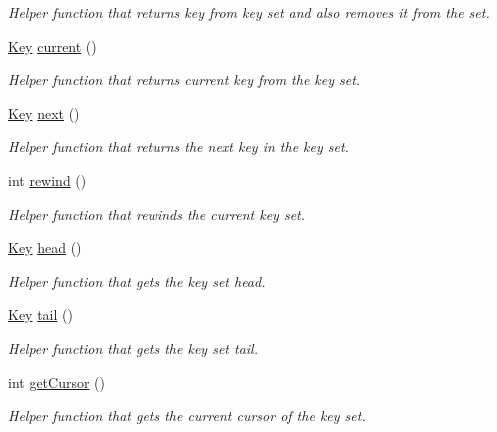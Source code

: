 \begin{DoxyCompactItemize}
\begin{DoxyCompactList}\small\item\em Helper function that returns key from key set and also removes it from the set. \end{DoxyCompactList}\item 
\hyperlink{classorg_1_1libelektra_1_1Key}{Key} \hyperlink{classorg_1_1libelektra_1_1KeySet_a684ac5513b51d841cc04bdcdb203c4cf}{current} ()
\begin{DoxyCompactList}\small\item\em Helper function that returns current key from the key set. \end{DoxyCompactList}\item 
\hyperlink{classorg_1_1libelektra_1_1Key}{Key} \hyperlink{classorg_1_1libelektra_1_1KeySet_a92aa593320132e4272602dda29aee2c7}{next} ()
\begin{DoxyCompactList}\small\item\em Helper function that returns the next key in the key set. \end{DoxyCompactList}\item 
int \hyperlink{classorg_1_1libelektra_1_1KeySet_a20533a5e97b16b76b977b95be179d58c}{rewind} ()
\begin{DoxyCompactList}\small\item\em Helper function that rewinds the current key set. \end{DoxyCompactList}\item 
\hyperlink{classorg_1_1libelektra_1_1Key}{Key} \hyperlink{classorg_1_1libelektra_1_1KeySet_a11ba1ef1213a9f1ac5743491bc7154e5}{head} ()
\begin{DoxyCompactList}\small\item\em Helper function that gets the key set head. \end{DoxyCompactList}\item 
\hyperlink{classorg_1_1libelektra_1_1Key}{Key} \hyperlink{classorg_1_1libelektra_1_1KeySet_ab81aff6c88595b3f4c3307d1f996857f}{tail} ()
\begin{DoxyCompactList}\small\item\em Helper function that gets the key set tail. \end{DoxyCompactList}\item 
int \hyperlink{classorg_1_1libelektra_1_1KeySet_a37e6d574b4595021a6cc732e325219e1}{get\+Cursor} ()
\begin{DoxyCompactList}\small\item\em Helper function that gets the current cursor of the key set. \end{DoxyCompactList}\item 

\end{DoxyCompactItemize}
